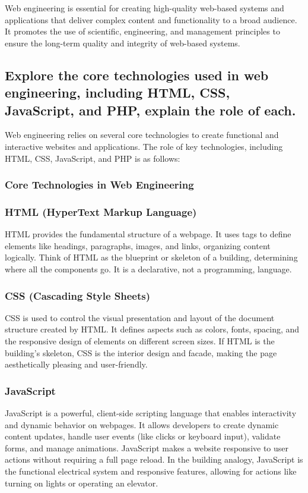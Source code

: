 \documentclass[a4paper,12pt]{article}
\begin{document}
Web engineering is essential for creating high-quality web-based systems and applications that deliver complex content and functionality to a broad audience. It promotes the use of scientific, engineering, and management principles to ensure the long-term quality and integrity of web-based systems.

\subsection{Explore the core technologies used in web engineering, including HTML, CSS, JavaScript, and PHP, explain the role of each.}

Web engineering relies on several core technologies to create functional and interactive websites and applications. The role of key technologies, including HTML, CSS, JavaScript, and PHP is as follows: 

\subsubsection*{Core Technologies in Web Engineering}

\subsubsection{HTML (HyperText Markup Language)}
HTML provides the fundamental structure of a webpage. It uses tags to define elements like headings, paragraphs, images, and links, organizing content logically. Think of HTML as the blueprint or skeleton of a building, determining where all the components go. It is a declarative, not a programming, language.

\subsubsection{CSS (Cascading Style Sheets)}
CSS is used to control the visual presentation and layout of the document structure created by HTML. It defines aspects such as colors, fonts, spacing, and the responsive design of elements on different screen sizes. If HTML is the building's skeleton, CSS is the interior design and facade, making the page aesthetically pleasing and user-friendly.

\subsubsection{JavaScript}
JavaScript is a powerful, client-side scripting language that enables interactivity and dynamic behavior on webpages. It allows developers to create dynamic content updates, handle user events (like clicks or keyboard input), validate forms, and manage animations. JavaScript makes a website responsive to user actions without requiring a full page reload. In the building analogy, JavaScript is the functional electrical system and responsive features, allowing for actions like turning on lights or operating an elevator.
\end{document}
